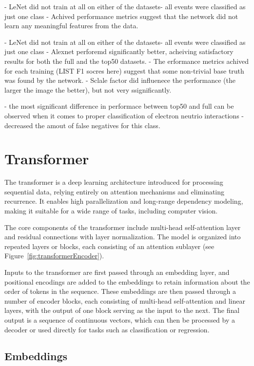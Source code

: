 \documentclass{pracalicmgr}
\begin{document}
- LeNet did not train at all on either of the datasets- all events were classified as just one class
- Achived performance metrics suggest that the network did not learn any meaningful features from the data.

- LeNet did not train at all on either of the datasets- all events were classified as just one class
- Alexnet perforemd significantly better, acheiving satisfactory results for both the full and the top50 datasets.
- The erformance metrics achived for each training (LIST F1 socres here) suggest that some non-trivial base truth was found by the network.
- Sclale factor did influenece the performance (the larger the image the better), but not very ssignificantly.

- the most significant difference in performace between top50 and full can be observed when it comes to proper classification of electron neutrio interactions - decreased the amout of false negatives for this class.

\section{Transformer}

The transformer is a deep learning architecture introduced for processing sequential data, relying entirely on attention mechanisms and eliminating recurrence. It enables high parallelization and long-range dependency modeling, making it suitable for a wide range of tasks, including computer vision.

The core components of the transformer include multi-head self-attention layer and residual connections with layer normalization. The model is organized into repeated layers or blocks, each consisting of an attention sublayer (see Figure~\ref{fig:transformerEncoder}).

Inputs to the transformer are first passed through an embedding layer, and positional encodings are added to the embeddings to retain information about the order of tokens in the sequence. These embeddings are then passed through a number of encoder blocks, each consisting of multi-head self-attention and linear layers, with the output of one block serving as the input to the next. The final output is a sequence of continuous vectors, which can then be processed by a decoder or used directly for tasks such as classification or regression.

\subsection{Embeddings}
\end{document}
